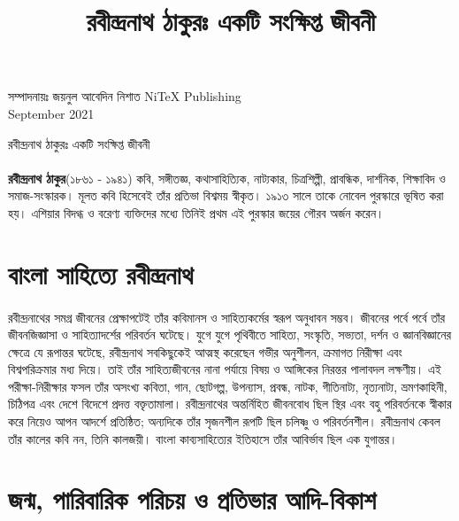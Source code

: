 \documentclass{article}
\title{রবীন্দ্রনাথ ঠাকুরঃ একটি সংক্ষিপ্ত জীবনী}
\date{}
\begin{document}
\maketitle
\thispagestyle{empty}
\vfill
\begin{center}
সম্পাদনায়ঃ জয়নুল আবেদিন নিশাত
\vfill
NiTeX Publishing\\September 2021
\end{center}
\clearpage
{}
\begin{center}
\huge{রবীন্দ্রনাথ ঠাকুরঃ একটি সংক্ষিপ্ত জীবনী}
\end{center}
\paragraph{}
\paragraph{}
\textbf{রবীন্দ্রনাথ ঠাকুর}(১৮৬১ - ১৯৪১) কবি, সঙ্গীতজ্ঞ, কথাসাহিত্যিক, নাট্যকার, চিত্রশিল্পী, প্রাবন্ধিক, দার্শনিক, শিক্ষাবিদ ও সমাজ-সংস্কারক। মূলত কবি হিসেবেই তাঁর প্রতিভা বিশ্বময় স্বীকৃত। ১৯১৩ সালে তাকে নোবেল পুরস্কারে ভূষিত করা হয়। এশিয়ার বিদগ্ধ ও বরেণ্য ব্যক্তিদের মধ্যে তিনিই প্রথম এই পুরস্কার জয়ের গৌরব অর্জন করেন।
\section{বাংলা সাহিত্যে রবীন্দ্রনাথ}
\paragraph{}
রবীন্দ্রনাথের সমগ্র জীবনের প্রেক্ষাপটেই তাঁর কবিমানস ও সাহিত্যকর্মের স্বরূপ অনুধাবন সম্ভব। জীবনের পর্বে পর্বে তাঁর জীবনজিজ্ঞাসা ও সাহিত্যাদর্শের পরিবর্তন ঘটেছে। যুগে যুগে পৃথিবীতে সাহিত্য, সংস্কৃতি, সভ্যতা, দর্শন ও জ্ঞানবিজ্ঞানের ক্ষেত্রে যে রূপান্তর ঘটেছে, রবীন্দ্রনাথ সবকিছুকেই আত্মস্থ করেছেন গভীর অনুশীলন, ক্রমাগত নিরীক্ষা এবং বিশ্বপরিক্রমার মধ্য দিয়ে। তাই তাঁর সাহিত্যজীবনের নানা পর্যায়ে বিষয় ও আঙ্গিকের নিরন্তর পালাবদল লক্ষণীয়। এই পরীক্ষা-নিরীক্ষার ফসল তাঁর অসংখ্য কবিতা, গান, ছোটগল্প, উপন্যাস, প্রবন্ধ, নাটক, গীতিনাট্য, নৃত্যনাট্য, ভ্রমণকাহিনী, চিঠিপত্র এবং দেশে বিদেশে প্রদত্ত বক্তৃতামালা। রবীন্দ্রনাথের অন্তর্নিহিত জীবনবোধ ছিল স্থির এবং বহু পরিবর্তনকে স্বীকার করে নিয়েও আপন আদর্শে প্রতিষ্ঠিত; অন্যদিকে তাঁর সৃজনশীল রূপটি ছিল চলিষ্ণু ও পরিবর্তনশীল। রবীন্দ্রনাথ কেবল তাঁর কালের কবি নন, তিনি কালজয়ী। বাংলা কাব্যসাহিত্যের ইতিহাসে তাঁর আবির্ভাব ছিল এক যুগান্তর।

\section{জন্ম, পারিবারিক পরিচয় ও প্রতিভার আদি-বিকাশ}
\end{document}
